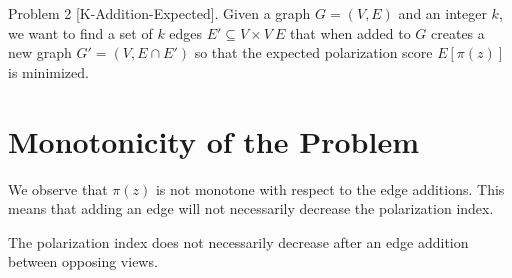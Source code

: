 \noindent Problem 2 [K-Addition-Expected]. Given a graph $G=(V,E)$ and an integer $k$, we want to find a set of $k$ edges $E′ \subseteq V×V \ E$ that when added to $G$ creates a new graph $G' = (V,E \cap E')$ so that the expected polarization score $E[\pi(z)]$ is minimized.


\section{Monotonicity of the Problem}
\label{sec:monotonicity}
\vspace{20pt}
We observe that $\pi(z)$ is not monotone with respect to the edge additions. This means that adding an edge will not necessarily decrease the polarization index. 
\\
\begin{lemma}
The polarization index does not necessarily decrease after an edge addition between opposing views.
\end{lemma}

